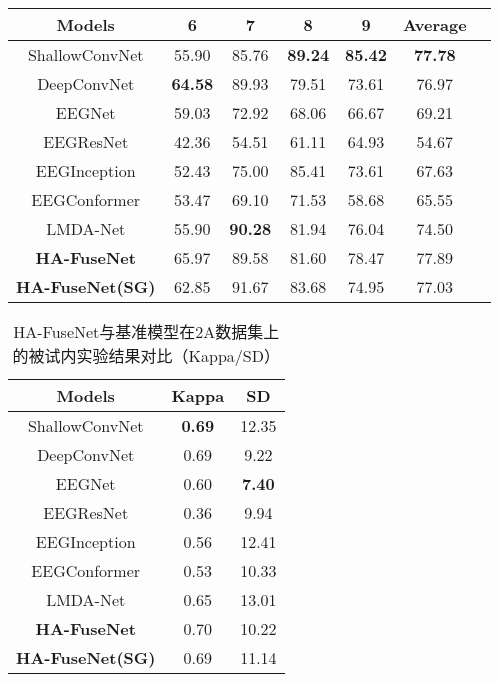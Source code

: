 \begin{table}[ht]
\begin{subtable}[ht]{\textwidth}
      \label{tab:2acompareinb}
      \begin{tabularx}{\textwidth}{cCCCCCC}
        \toprule
        Models & 6 & 7 & 8 & 9 & Average \\
        \midrule
        ShallowConvNet\cite{schirrmeister2017deep}  & 55.90 & 85.76 & \textbf{89.24} & \textbf{85.42} & \textbf{77.78} \\
        DeepConvNet\cite{schirrmeister2017deep} & \textbf{64.58} & 89.93 & 79.51 & 73.61 & 76.97 \\
        EEGNet\cite{lawhern2018eegnet} & 59.03 & 72.92 & 68.06 & 66.67 & 69.21 \\
        EEGResNet\cite{HBM:HBM23730} & 42.36 & 54.51 & 61.11 & 64.93 & 54.67 \\
        EEGInception\cite{zhang2021eeg} & 52.43 & 75.00 & 85.41 & 73.61 & 67.63 \\
        EEGConformer\cite{song2022eeg} & 53.47 & 69.10 & 71.53 & 58.68 & 65.55 \\
        LMDA-Net\cite{miao2023lmda} & 55.90 & \textbf{90.28} & 81.94 & 76.04 & 74.50 \\
        \midrule 
        \textbf{HA-FuseNet}  & 65.97 & 89.58 & 81.60 & 78.47 & 77.89 \\
        \textbf{HA-FuseNet(SG)}  & 62.85 & 91.67 & 83.68 & 74.95 & 77.03 \\
        \bottomrule
      \end{tabularx}
    \end{subtable}
\end{table}
\begin{table}[H]
    \centering
    \caption{HA-FuseNet与基准模型在2A数据集上的被试内实验结果对比（Kappa/SD）}
    \label{tab:2acompareinsd}
    \begin{tabularx}{\textwidth}{CCC}
      \toprule
      Models & Kappa & SD \\
      \midrule
      ShallowConvNet\cite{schirrmeister2017deep} & \textbf{0.69} & 12.35\\
      DeepConvNet\cite{schirrmeister2017deep} & 0.69 & 9.22 \\
      EEGNet\cite{lawhern2018eegnet} & 0.60 & \textbf{7.40} \\
      EEGResNet\cite{HBM:HBM23730} & 0.36 & 9.94 \\
      EEGInception\cite{zhang2021eeg} & 0.56 & 12.41 \\
      EEGConformer\cite{song2022eeg} & 0.53 & 10.33 \\
      LMDA-Net\cite{miao2023lmda} & 0.65 & 13.01 \\
      \midrule 
      \textbf{HA-FuseNet} &0.70&10.22\\
      \textbf{HA-FuseNet(SG)} &0.69&11.14\\
      \bottomrule
    \end{tabularx}
\end{table}

